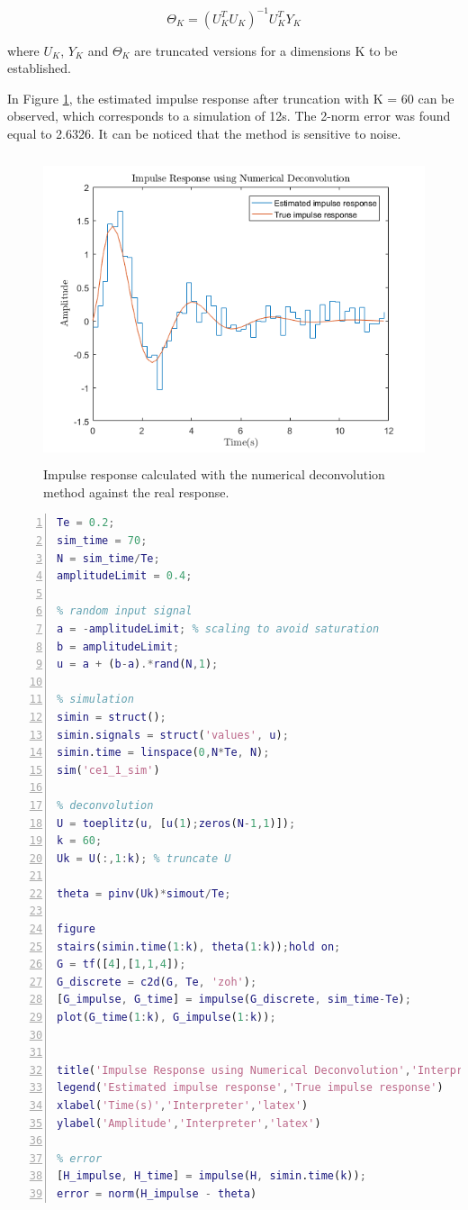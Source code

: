 \documentclass[a4paper,11pt]{article}
\begin{document}
\begin{equation}
\label{eq:deconv_K}
\Theta_K = (U_K^{T}U_K)^{-1}U_K^{T}Y_K
\end{equation}

where $U_K$, $Y_K$ and $\Theta_K$ are truncated versions for a dimensions K to be established. 

In Figure \ref{fig:num_deconv}, the estimated impulse response after truncation with K = 60 can be observed, which corresponds to a simulation of 12s. The 2-norm error was found equal to 2.6326. It can be noticed that the method is sensitive to noise. 

\begin{figure}[H]
	\centering
    \includegraphics[height=9cm]{images/impulse_num_deconv}
    \caption{Impulse response calculated with the numerical deconvolution method against the real response.}
    \label{fig:num_deconv}
\end{figure}

\begin{lstlisting}[language=Matlab,numbers=left,caption=Numerical deconvolution,label=lst:num_deconv]
Te = 0.2;
sim_time = 70;
N = sim_time/Te;
amplitudeLimit = 0.4;

% random input signal
a = -amplitudeLimit; % scaling to avoid saturation
b = amplitudeLimit;
u = a + (b-a).*rand(N,1);

% simulation
simin = struct();
simin.signals = struct('values', u);
simin.time = linspace(0,N*Te, N);
sim('ce1_1_sim')

% deconvolution
U = toeplitz(u, [u(1);zeros(N-1,1)]);
k = 60;
Uk = U(:,1:k); % truncate U

theta = pinv(Uk)*simout/Te;

figure
stairs(simin.time(1:k), theta(1:k));hold on;
G = tf([4],[1,1,4]);
G_discrete = c2d(G, Te, 'zoh');
[G_impulse, G_time] = impulse(G_discrete, sim_time-Te);
plot(G_time(1:k), G_impulse(1:k)); 


title('Impulse Response using Numerical Deconvolution','Interpreter','latex')
legend('Estimated impulse response','True impulse response')
xlabel('Time(s)','Interpreter','latex')
ylabel('Amplitude','Interpreter','latex')

% error
[H_impulse, H_time] = impulse(H, simin.time(k));
error = norm(H_impulse - theta)
\end{lstlisting}
\end{document}
